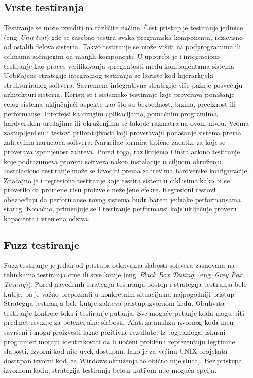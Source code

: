 \documentclass[a4paper]{article}
\begin{document}
{\subsection{Vrste testiranja}
\label{subsec:vrste_testiranja}
Testiranje se može izvoditi na različite načine. Čest pristup je testiranje jedinice (eng~{\em Unit test}) gde se zasebno testira svaka programska 
komponenta, nezavisno od ostalih delova sistema. Takvo testiranje se može vršiti na podprogramima ili celinama sačinjenim od manjih komponenti.
U upotrebi je i integraciono testiranje kao proces verifikovanja spregnutosti među komponentama sistema. Uobičajene strategije integralnog testiranja se koriste kod hijerarhijski strukturiranog softvera. Savremene integrativne strategije više pažnje posvećuju arhitekturi sistema. Koristi se i sistemsko testiranje koje proverava ponašanje celog sistema uključujući aspekte kao što su bezbednost, brzina, preciznost ili performanse. Interfejsi ka drugim aplikacijama, pomoćnim programima, hardverskim uređajima ili okruženjima se takođe razmatra na ovom nivou.
Veoma zastupljeni su i testovi prihvatljivosti koji proveravaju ponašanje sistema prema zahtevima narucioca softvera. Narucilac formira tipične zadatke za koje se proverava ispunjenost zahteva. Pored toga, razlikujemo i instalaciono testiranje koje podrazumeva proveru softvera 
nakon instalacije u ciljnom okruženju. Instalaciono testiranje može se izvoditi prema zahtevima hardverske konfiguracije. Značajno je i regresiono testiranje koje testira sistem u ciklusima kako bi se proverilo da promene
nisu proizvele neželjene efekte. Regresioni testovi obezbeđuju da performanse novog sistema budu barem jednake performansama starog.
Konačno, primenjuje se i testiranje performansi koje uključuje proveru kapaciteta i vremena odziva. 
 
\subsection{Fuzz testiranje}
\label{subsec:fuzz_testiranje}
Fuzz testiranje je jedan od pristupa otkrivanja slabosti softvera zasnovana na tehnikama testiranja crne ili sive kutije (eng~{\em Black Box Testing}, (eng~{\em Grey Box Testing})). Pored navedenih strategija testiranja 
postoji i strategija testiranja bele kutije, pa je važno prepoznati 
u konkretnim situacijama najpogodniji pristup.
Strategija testiranja bele kutije zahteva pristup izvornom kodu. Obuhvata testiranje kontrole toka i testiranje putanja. Sve moguće putanje koda mogu biti predmet revizije za potencijalne slabosti.
Alati za analizu izvornog koda nisu savršeni i mogu proizvesti lažne pozitivne rezultate. Iz tog razloga, iskusni programeri moraju identifikovati da li uočeni problemi reprezentuju legitimne slabosti.
Izvorni kod nije uvek dostupan. Iako je za većinu UNIX projekata dostupan izvorni kod, za Windows okruženja to obično nije slučaj. Bez pristupa izvornom kodu, strategija testiranja belom kutijom nije moguća opcija.
\\

}
\end{document}
